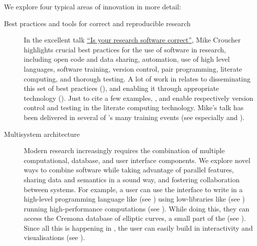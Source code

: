 \documentclass{deliverablereport}
\begin{document}
We explore four typical areas of innovation in more detail:
\begin{description}
\item[Best practices and tools for correct and reproducible research]
  In the excellent talk
  \href{https://mikecroucher.github.io/MLPM_talk/}{``Is your research
    software correct''}, Mike Croucher highlights crucial best
  practices for the use of software in research, including open code
  and data sharing, automation, use of high level languages, software
  training, version control, pair programming, literate computing, and thorough
  testing. A lot of work in \ODK relates to disseminating this set of
  best practices (), and enabling it through
  appropriate technology ().  Just to cite a few
  examples, , and
   enable respectively version control
  and testing in the \Jupyter literate computing technology.
  Mike's talk has been delivered in several of \ODK's many training events (see
  especially  and
  ).
  \smallskip
\item[Multisystem architecture]
  Modern research increasingly requires the combination of multiple
  computational, database, and user interface components.
  We explore novel ways to combine software while taking
  advantage of parallel features, sharing data and
  semantics in a sound way, and fostering
  collaboration between systems.
  For example, a user can use the \Jupyter interface to write
  in a high-level programming language like \Sage (see )
  using low-libraries like \Pari (see )
  running high-performance computations (see ).
  While doing this, they can access
  the Cremona database of elliptic curves, a small part of the \LMFDB
  (see ).
  Since all this is happening in \Jupyter, the user can easily build in
  interactivity and visualisations (see ).


\end{description}
\end{document}
